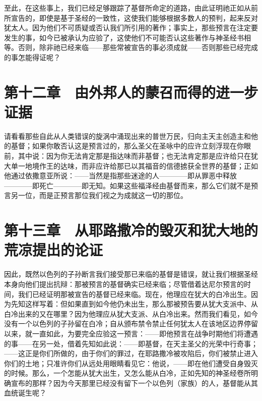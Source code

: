 至此，在这些事上，我们已经足够跟踪了基督所命定的道路，由此证明祂正如从前所宣告的，即使是基于圣经的一致性，这使我们能够根据多数人的预判，起来反对犹太人。因为他们不可质疑或否认我们所引用的著作；事实上，那些预言在注定要发生的事，如今已被承认为应验了，这使他们不可能否认这些著作与神圣经书相等。否则，除非祂已经来临——那些常被宣告的事必须成就——否则那些已经完成的事怎能得证呢？\par


\section{第十二章　由外邦人的蒙召而得的进一步证据}

请看看那些自此从人类错误的旋涡中涌现出来的普世万民，归向主天主创造主和他的基督；如果你敢否认这是预言过的，那么圣父在圣咏中的应许立刻浮现在你眼前，其中说：因为你无法肯定那是指达味而非基督；也无法肯定那是应许给只在犹大单一地境作王的达味，而非应许给那已以其福音的信德掳获全世界的基督；正如他通过依撒意亚所说：——当然是指那些迷途的人————即从罪恶中释放————即死亡————即无知。如果这些福泽经由基督而来，那么它们就不是预言另一位，而是正预言那位我们视之为成就这一切的那位。\par


\section{第十三章　从耶路撒冷的毁灭和犹大地的荒凉提出的论证}

因此，既然以色列的子孙断言我们接受那已来临的基督是错误，就让我们根据圣经本身向他们提出抗辩：那被预言的基督确实已经来临；尽管借着达尼尔预言的时间，我们已经证明那被宣告的基督已经来临。现在，他理应在犹大的白冷出生。因为先知这样写着：但如果直到如今他仍未出生，那么那被预告要从犹大支派中、从白冷出来的又在哪里？因为他理应从犹大支派、从白冷出来。然而我们看见，如今没有一个以色列的子孙留在白冷；自从颁布禁令禁止任何犹太人在该地区边界停留以来，就一直如此，为要完全应验这一预言：——即他预言在战争时期他们将遭遇的事——在另一处，借着先知如此说：——即基督，在天主圣父的光荣中行奇事；——这正是你们所做的，由于你们的罪过，在耶路撒冷被攻陷后，你们被禁止进入你们的土地；只准许你们从远处用眼睛看见它：他说，——即在他们遭受自身毁灭的时候。那么，一个怎能从犹大出生，又怎么能从白冷，正如先知的神圣经卷所明确宣布的那样？因为今天那里已经没有留下一个以色列（家族）的人，基督能从其血统诞生呢？\par

